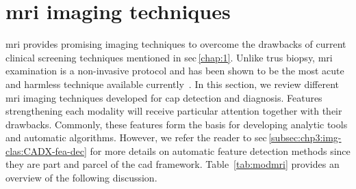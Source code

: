 \section{\acs*{mri} imaging techniques}\label{sec:chp2:imaging}

\ac{mri} provides promising imaging techniques to overcome the drawbacks of current clinical screening techniques mentioned in \acs{sec}\,\ref{chap:1}.
Unlike \ac{trus} biopsy, \ac{mri} examination is a non-invasive protocol and has been shown to be the most acute and harmless technique available currently~\cite{Turkbey2012}.
In this section, we review different \ac{mri} imaging techniques developed for \ac{cap} detection and diagnosis.
Features strengthening each modality will receive particular attention together with their drawbacks.
Commonly, these features form the basis for developing analytic tools and automatic algorithms.
However, we refer the reader to \acs{sec}\,\ref{subsec:chp3:img-clas:CADX-fea-dec} for more details on automatic feature detection methods since they are part and parcel of the \acs{cad} framework.
Table~\ref{tab:modmri} provides an overview of the following discussion.




